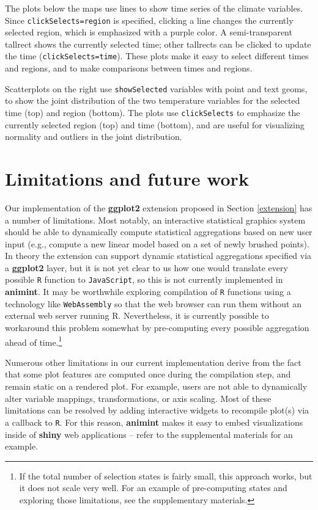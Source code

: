 \documentclass[12pt,]{article}
\let\rmarkdownfootnote\footnote%
\def\footnote{\protect\rmarkdownfootnote}
\theoremstyle{definition}
\theoremstyle{definition}
\theoremstyle{definition}
\theoremstyle{remark}
\begin{document}
The plots below the maps use lines to show time series of the climate
variables. Since \texttt{clickSelects=region} is specified, clicking a
line changes the currently selected region, which is emphasized with a
purple color. A semi-transparent tallrect shows the currently selected
time; other tallrects can be clicked to update the time
(\texttt{clickSelects=time}). These plots make it easy to select
different times and regions, and to make comparisons between times and
regions.

Scatterplots on the right use \texttt{showSelected} variables with point
and text geoms, to show the joint distribution of the two temperature
variables for the selected time (top) and region (bottom). The plots use
\texttt{clickSelects} to emphasize the currently selected region (top)
and time (bottom), and are useful for visualizing normality and outliers
in the joint distribution.

\hypertarget{limitations}{%
\section{Limitations and future work}\label{limitations}}

Our implementation of the \textbf{ggplot2} extension proposed in Section
\ref{extension} has a number of limitations. Most notably, an
interactive statistical graphics system should be able to dynamically
compute statistical aggregations based on new user input (e.g., compute
a new linear model based on a set of newly brushed points). In theory
the extension can support dynamic statistical aggregations specified via
a \textbf{ggplot2} layer, but it is not yet clear to us how one would
translate every possible \texttt{R} function to \texttt{JavaScript}, so
this is not currently implemented in \textbf{animint}. It may be
worthwhile exploring compilation of \texttt{R} functions using a
technology like \texttt{WebAssembly} so that the web browser can run
them without an external web server running R. Nevertheless, it is
currently possible to workaround this problem somewhat by pre-computing
every possible aggregation ahead of time.\footnote{If the total 
number of selection states is fairly small, this approach works, but it does not 
scale very well. For an example of pre-computing states and exploring those limitations, 
see the supplementary materials.}

Numerous other limitations in our current implementation derive from the
fact that some plot features are computed once during the compilation
step, and remain static on a rendered plot. For example, users are not
able to dynamically alter variable mappings, transformations, or axis
scaling. Most of these limitations can be resolved by adding interactive
widgets to recompile plot(s) via a callback to \texttt{R}. For this
reason, \textbf{animint} makes it easy to embed visualizations inside of
\textbf{shiny} web applications -- refer to the supplemental materials
for an example.
\end{document}
